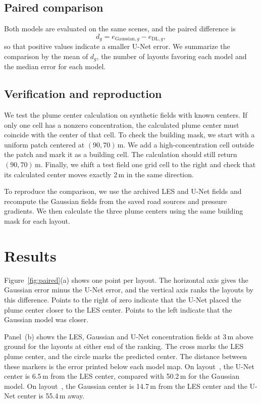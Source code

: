 \documentclass{article}
\begin{document}
\subsection{Paired comparison}

Both models are evaluated on the same scenes, and the paired difference is
\begin{equation}
  d_g = e_{\mathrm{Gaussian},g} - e_{\mathrm{DL},g},
  \label{eq:paired}
\end{equation}
so that positive values indicate a smaller U-Net error. We summarize the
comparison by the mean of $d_g$, the number of layouts favoring each model
and the median error for each model.

\subsection{Verification and reproduction}

We test the plume center calculation on synthetic fields with known
centers. If only one cell has a nonzero concentration, the calculated
plume center must coincide with the center of that cell. To check the
building mask, we start with a uniform patch centered at $(90,70)$\,m.
We add a high-concentration cell outside the patch and mark it as a
building cell. The calculation should still return $(90,70)$\,m.
Finally, we shift a test field one grid cell to the right and check
that its calculated center moves exactly 2\,m in the same direction.

To reproduce the comparison, we use the archived LES and U-Net fields
and recompute the Gaussian fields from the saved road sources and
pressure gradients. We then calculate the three plume centers using
the same building mask for each layout.


\section{Results}
\label{sec:results}

Figure~\ref{fig:paired}(a) shows one point per layout. The horizontal
axis gives the Gaussian error minus the U-Net error, and the vertical
axis ranks the layouts by this difference. Points to the right of zero
indicate that the U-Net placed the plume center closer to the LES
center. Points to the left indicate that the Gaussian model was closer.

Panel~(b) shows the LES, Gaussian and U-Net concentration fields at
3\,m above ground for the layouts at either end of the ranking.
The cross marks the LES plume center, and the circle marks the
predicted center. The distance between these markers is the error
printed below each model map. On layout~\MaxDiffScene{}, the U-Net
center is 6.5\,m from the LES center, compared with 50.2\,m for the
Gaussian model. On layout~\MinDiffScene{}, the Gaussian center is
14.7\,m from the LES center and the U-Net center is 55.4\,m away.
\end{document}
